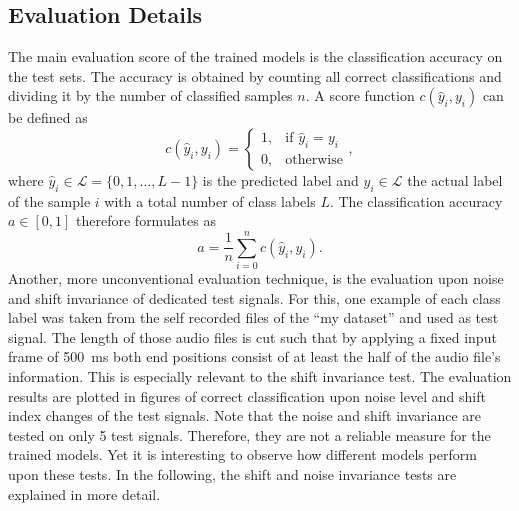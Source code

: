 
\subsection{Evaluation Details}\label{sec:exp_details_tb}
The main evaluation score of the trained models is the classification accuracy on the test sets.
The accuracy is obtained by counting all correct classifications and dividing it by the number of classified samples $n$.
A score function $c(\hat{y}_i, y_i)$ can be defined as
\begin{equation}
  c(\hat{y}_i, y_i) = 
  \begin{cases}
    1, & \text{if } \hat{y}_i = y_i\\
    0, & \text{otherwise} 
  \end{cases},
\end{equation}
where $\hat{y}_i \in \mathcal{L} = \{0, 1, \dots, L - 1\} $ is the predicted label and $y_i \in \mathcal{L}$ the actual label of the sample $i$ with a total number of class labels $L$.
The classification accuracy $a \in [0, 1]$ therefore formulates as
\begin{equation}
  a = \frac{1}{n} \sum_{i=0}^n c(\hat{y}_i, y_i).
\end{equation}
Another, more unconventional evaluation technique, is the evaluation upon noise and shift invariance of dedicated test signals.
For this, one example of each class label was taken from the self recorded files of the \enquote{my dataset} and used as test signal.
The length of those audio files is cut such that by applying a fixed input frame of \SI{500}{\milli\second} both end positions consist of at least the half of the audio file's information.
This is especially relevant to the shift invariance test.
The evaluation results are plotted in figures of correct classification upon noise level and shift index changes of the test signals.
Note that the noise and shift invariance are tested on only 5 test signals.
Therefore, they are not a reliable measure for the trained models.
Yet it is interesting to observe how different models perform upon these tests.
In the following, the shift and noise invariance tests are explained in more detail.



